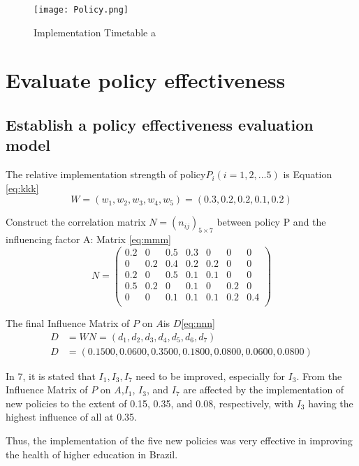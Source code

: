 \documentclass[12pt]{article}  %
\begin{document}
\begin{figure}[htp]
	\centering
	\texttt{[image: Policy.png]}
	\caption{Implementation Timetable a}\label{fig:ddd}
\end{figure}

\section{Evaluate policy effectiveness}
\subsection{Establish a policy effectiveness evaluation model}
The relative implementation strength of policy$P_i(i=1,2,...5)$ is Equation \eqref{eq:kkk} 
\begin{equation}\label{eq:kkk}
W=(w_1,w_2,w_3,w_4,w_5)=(0.3,0.2,0.2,0.1,0.2)
\end{equation}

Construct the correlation matrix $N=(n_{ij})_{5\times7}$ between policy P and the influencing factor A: Matrix \eqref{eq:mmm}
\begin{equation}\label{eq:mmm}
N=\begin{pmatrix}
0.2&0&0.5&0.3&0&0&0\\
0&0.2&0.4&0.2&0.2&0&0\\
0.2&0&0.5&0.1&0.1&0&0\\
0.5&0.2&0&0.1&0&0.2&0\\
0&0&0.1&0.1&0.1&0.2&0.4\\
\end{pmatrix}
\end{equation}

The final Influence Matrix of $P$ on $A$is $D$\eqref{eq:nnn}
\begin{equation}\label{eq:nnn}
\begin{split}
D&=WN=(d_1,d_2,d_3,d_4,d_5,d_6,d_7)\\
D&=(0.1500,0.0600,0.3500,0.1800,0.0800,0.0600,0.0800)
\end{split}
\end{equation}

In 7, it is stated that $I_1,I_3,I_7$ need to be improved, especially for $I_3$. From the Influence Matrix of $P$ on $A$,$I_1$, $I_3$, and $I_7$ are affected by the implementation of new policies to the extent of 0.15, 0.35, and 0.08, respectively, with $I_3$ having the highest influence of all at 0.35. 

Thus, the implementation of the five new policies was very effective in improving the health of higher education in Brazil.
\end{document}
